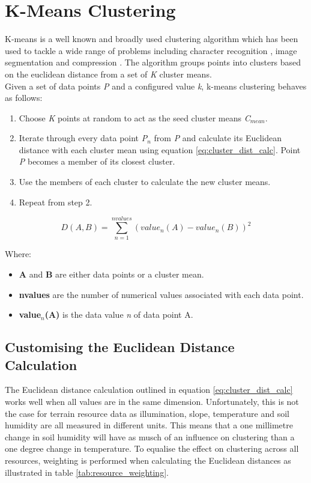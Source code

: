 \section{K-Means Clustering}

K-means is a well known and broadly used clustering algorithm \cite{Jain2010} which has been used to tackle a wide range of problems including character recognition \cite{Perrone2000}, image segmentation \cite{Bradley1998,Kanungo2002} and compression \cite{Kanungo2002}. The algorithm groups points into clusters based on the euclidean distance from a set of \textit{K} cluster means.\\

Given a set of data points \textit{P} and a configured value \textit{k}, k-means clustering behaves as follows:
\begin{enumerate}
\item Choose \textit{K} points at random to act as the seed cluster means \textit{C$_{mean}$}.
\item Iterate through every data point \textit{P$_{n}$} from \textit{P} and calculate its Euclidean distance with each cluster mean using equation \ref{eq:cluster_dist_calc}. Point \textit{P} becomes a member of its closest cluster. 
\item Use the members of each cluster to calculate the new cluster means. 
\item Repeat from step 2. 
\end{enumerate}

\begin{equation} \label{eq:cluster_dist_calc}
D(A,B) = \sum_{n=1}^{nvalues} (value_{n}(A) - value_{n}(B)) ^{2}
\end{equation}

Where:
\begin{itemize}
\item \textbf{A} and \textbf{B} are either data points or a cluster mean.
\item \textbf{nvalues} are the number of numerical values associated with each data point.
\item \textbf{value$_{n}$(A)} is the data value \textit{n} of data point A.
\end{itemize}

\subsection{Customising the Euclidean Distance Calculation}

The Euclidean distance calculation outlined in equation \ref{eq:cluster_dist_calc} works well when all values are in the same dimension. Unfortunately, this is not the case for terrain resource data as illumination, slope, temperature and soil humidity are all measured in different units. This means that a one millimetre change in soil humidity will have as musch of an influence on clustering than a one degree change in temperature. To equalise the effect on clustering across all resources, weighting is performed when calculating the Euclidean distances as illustrated in table \ref{tab:resource_weighting}.

